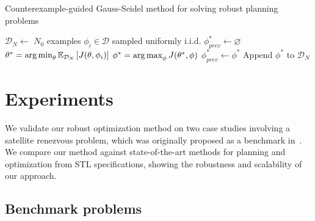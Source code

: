 \begin{algorithm}
    \caption{Counterexample-guided Gauss-Seidel method for solving robust planning problems}\label{ch:iros:alg:cg_gs}
    \DontPrintSemicolon
    $\mathcal{D}_N \gets $ $N_0$ examples $\phi_i \in \mathcal{D}$ sampled uniformly i.i.d.\;
    $\phi^*_{prev} \gets \varnothing$\;
    {
    $\theta^* = \operatorname*{arg\,min}_\theta \mathbb{E}_{\mathcal{D}_N} \left[ J(\theta, \phi_i) \right] \label{ch:iros:alg:opt_theta}$ \;
    $\phi^* = \operatorname*{arg\,max}_\phi J(\theta^*, \phi)$ \label{ch:iros:alg:opt_chi} \;
    $\phi^*_{prev} \gets \phi^*$\;
    Append $\phi^*$ to $\mathcal{D}_N$\;
    }
\end{algorithm}

\section{Experiments}\label{ch:iros:experiments}

We validate our robust optimization method on two case studies involving a satellite renezvous problem, which was originally proposed as a benchmark in~\cite{jewisonSpacecraftBenchmarkProblem2016}. We compare our method against state-of-the-art methods for planning and optimization from STL specifications, showing the robustness and scalability of our approach.

\subsection{Benchmark problems}

